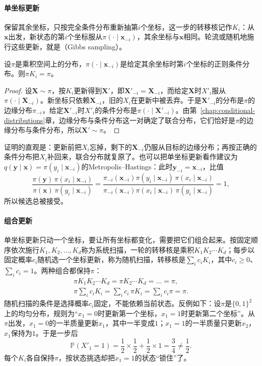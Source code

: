 \paragraph{单坐标更新}
保留其余坐标，只按完全条件分布重新抽第$i$个坐标，这一步的转移核记作$K_i$：从$\bm{x}$出发，新状态的第$i$个坐标服从$\pi(\cdot\mid\bm{x}_{-i})$，其余坐标与$\bm{x}$相同。轮流或随机地施行这些更新，就是（Gibbs sampling）。

\begin{theorem}[单坐标更新保持目标]
\label{thm:sgen-gibbs}
设$\pi$是乘积空间上的分布，$\pi(\cdot\mid\bm{x}_{-i})$是给定其余坐标时第$i$个坐标的正则条件分布。则$\pi K_i=\pi$。
\end{theorem}

\begin{proof}
设$\bm{X}\sim\pi$，按$K_i$更新得到$\bm{X}'$，即$\bm{X}'_{-i}=\bm{X}_{-i}$，而给定$\bm{X}$时$X'_i$服从$\pi(\cdot\mid\bm{X}_{-i})$。新坐标只依赖$\bm{X}_{-i}$，旧的$X_i$在更新中被丢弃。于是$\bm{X}'_{-i}$的分布是$\pi$的边缘分布$\pi_{-i}$，给定$\bm{X}'_{-i}$时$X'_i$的条件分布是$\pi(\cdot\mid\bm{X}'_{-i})$。由第~\ref{chap:conditional-distributions}章，边缘分布与条件分布这一对确定了联合分布，它们恰好是$\pi$的边缘分布与条件分布，所以$\bm{X}'\sim\pi$。
\end{proof}

证明的直观是：更新前把$X_i$忘掉，剩下的$\bm{X}_{-i}$仍服从目标的边缘分布；再按正确的条件分布把$X_i$补回来，联合分布就复原了。也可以把单坐标更新看作建议为$q(\bm{y}\mid\bm{x})=\pi(y_i\mid\bm{x}_{-i})$的Metropolis--Hastings：此时$\bm{y}_{-i}=\bm{x}_{-i}$，比值
\[
  \frac{\pi(\bm{y})\,\pi(x_i\mid\bm{x}_{-i})}{\pi(\bm{x})\,\pi(y_i\mid\bm{x}_{-i})}=\frac{\pi_{-i}(\bm{x}_{-i})\pi(y_i\mid\bm{x}_{-i})\,\pi(x_i\mid\bm{x}_{-i})}{\pi_{-i}(\bm{x}_{-i})\pi(x_i\mid\bm{x}_{-i})\,\pi(y_i\mid\bm{x}_{-i})}=1,
\]
所以候选总被接受。

\paragraph{组合更新}
单坐标更新只动一个坐标，要让所有坐标都变化，需要把它们组合起来。按固定顺序依次施行$K_1,K_2,\dots,K_d$称为系统扫描，一轮的转移核是乘积$K_1K_2\cdots K_d$；每步以固定概率$c_i$随机选一个坐标更新，称为随机扫描，转移核是$\sum_ic_iK_i$，其中$c_i\ge0$、$\sum_ic_i=1$。两种组合都保持$\pi$：
\[
  \begin{gathered}
    \pi K_1K_2\cdots K_d=\pi K_2\cdots K_d=\dots=\pi,\\
    \pi\sum_ic_iK_i=\sum_ic_i\,\pi K_i=\sum_ic_i\pi=\pi.
  \end{gathered}
\]
随机扫描的条件是选择概率$c_i$固定，不能依赖当前状态。反例如下：设$\pi$是$\{0,1\}^{2}$上的均匀分布，规则为“$x_1=0$时更新第一个坐标，$x_1=1$时更新第二个坐标”。从$\pi$出发，$x_1=0$的一半质量更新$x_1$，其中一半变成$1$；$x_1=1$的一半质量只更新$x_2$，$x_1$保持为$1$。于是一步后
\[
  \mathbb{P}(X'_1=1)=\frac12\times\frac12+\frac12\times1=\frac34\ne\frac12 .
\]
每个$K_i$各自保持$\pi$，按状态挑选却把$x_1=1$的状态“锁住”了。

